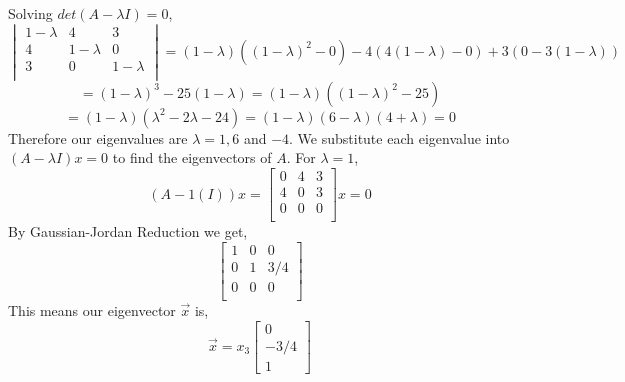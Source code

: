 Solving $det(A-\lambda I) = 0$,
\[\begin{vmatrix} 1 - \lambda & 4 & 3 \\ 4 & 1 -\lambda & 0 \\ 3 & 0 & 1 -\lambda \\ \end{vmatrix} = (1 - \lambda)((1-\lambda)^2-0)-4(4(1-\lambda)-0)+3(0-3(1-\lambda))\]
\[ = (1-\lambda)^3 - 25(1-\lambda) = (1-\lambda)((1-\lambda)^2 - 25) \]
\[= (1-\lambda)(\lambda^2-2\lambda -24) = (1 - \lambda)(6-\lambda)(4+\lambda) = 0 \]
Therefore our eigenvalues are $\lambda = 1, 6$ and $-4$.
We substitute each eigenvalue into $(A-\lambda I)x = 0$ to find the eigenvectors of $A$.
For $\lambda = 1$,
\[(A-1(I))x = \begin{bmatrix} 0 & 4 & 3 \\ 4 & 0 & 3 \\ 0 & 0 & 0 \\ \end{bmatrix}x = 0 \]
By Gaussian-Jordan Reduction we get, 
\[\begin{bmatrix} 1 & 0 & 0 \\ 0 & 1 & 3/4 \\ 0 & 0 & 0 \\ \end{bmatrix} \]
This means our eigenvector $\vec{x}$ is, 
\[\vec{x} = x_3\begin{bmatrix} 0 \\ -3/4 \\ 1 \end{bmatrix}\]


